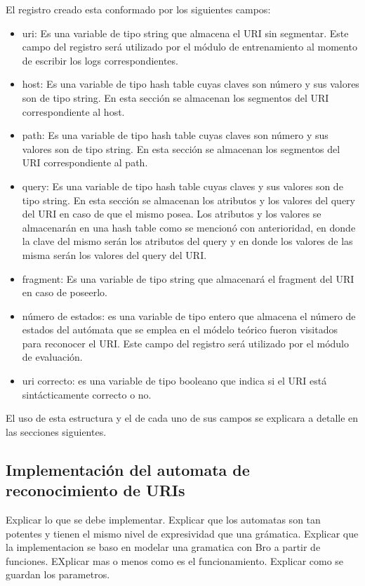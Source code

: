 El registro creado esta conformado por los siguientes campos:
\begin{itemize}
\item uri: Es una variable de tipo string que almacena el URI sin segmentar. Este campo del registro será utilizado por el módulo de entrenamiento al momento de escribir los logs correspondientes.
\item host: Es una variable de tipo hash table cuyas claves son número y sus valores  son de tipo string. En esta sección se almacenan los segmentos del URI correspondiente al host.
\item path: Es una variable de tipo hash table cuyas claves son número y sus valores  son de tipo string. En esta sección se almacenan los segmentos del URI correspondiente al path.
\item query: Es una variable de tipo hash table cuyas claves y sus valores son de tipo string. En esta sección se almacenan los atributos y los valores del query del URI en caso de que el mismo posea. Los atributos y los valores se almacenarán en una hash table como se mencionó con anterioridad, en donde la clave del mismo serán los atributos del query y en donde los valores de las misma serán los valores del query del URI.
\item fragment: Es una variable de tipo string que almacenará el fragment del URI en caso de poseerlo.
\item número de estados: es una variable de tipo entero que almacena el número de estados del autómata que se emplea en el módelo teórico fueron visitados para reconocer el URI. Este campo del registro será utilizado por el módulo de evaluación.
\item uri correcto: es una variable de tipo booleano que indica si el URI está sintácticamente correcto o no.
\end{itemize}

El uso de esta estructura y el de cada uno de sus campos se explicara a detalle en las secciones siguientes.

\subsection{Implementación del automata de reconocimiento de URIs}
Explicar lo que se debe implementar.
Explicar que los automatas son tan potentes y tienen el mismo nivel de expresividad que una grámatica.
Explicar que la implementacion se baso en modelar una gramatica con Bro a partir de funciones.
EXplicar mas o menos como es el funcionamiento.
Explicar como se guardan los parametros.
